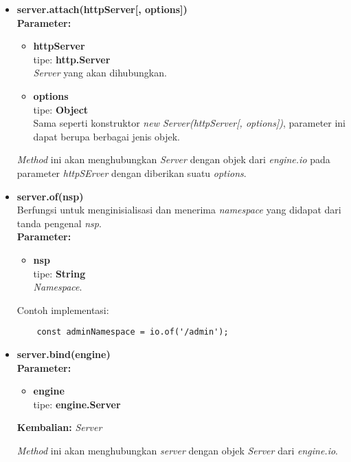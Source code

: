 \begin{enumerate}
\begin{itemize}
			\item \textbf{server.attach(httpServer[, options])} \\
			\textbf{Parameter:} 
			\begin{itemize}
				\item \textbf{httpServer} \\tipe: \textbf{http.Server} \\ \textit{Server} yang akan dihubungkan.
				\item \textbf{options} \\tipe: \textbf{Object} \\ Sama seperti konstruktor \textit{new Server(httpServer[, options])}, parameter ini dapat berupa berbagai jenis objek.
			\end{itemize}
			\textit{Method} ini akan menghubungkan \textit{Server} dengan objek dari \textit{engine.io} pada parameter \textit{httpSErver} dengan diberikan suatu \textit{options}.
			
			\item \textbf{server.of(nsp)} \\
			Berfungsi untuk menginisialisasi dan menerima \textit{namespace} yang didapat dari tanda pengenal \textit{nsp}. \\
			\textbf{Parameter:}
			\begin{itemize}
				\item \textbf{nsp} \\tipe: \textbf{String} \\ \textit{Namespace}.
			\end{itemize}
			Contoh implementasi:
	\begin{lstlisting}
	const adminNamespace = io.of('/admin');
	\end{lstlisting}
			
			\item \textbf{server.bind(engine)} \\
			\textbf{Parameter:}
			\begin{itemize}
				\item \textbf{engine} \\tipe: \textbf{engine.Server}
			\end{itemize}
			\textbf{Kembalian:} \textit{Server}
			
			\textit{Method} ini akan menghubungkan \textit{server} dengan objek \textit{Server} dari \textit{engine.io}.
			

\end{itemize}
\end{enumerate}
